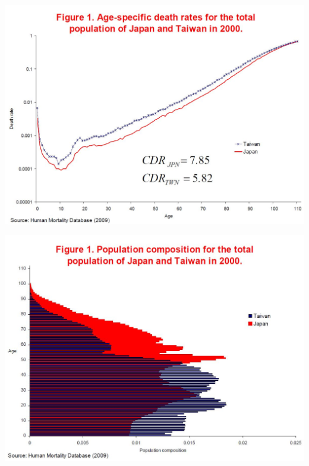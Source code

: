 \documentclass[xcolor={dvipsnames}]{beamer}
\begin{document}
\begin{frame}
\begin{center}
\includegraphics[scale=.3]{Figures/VCR3}
\end{center}
\end{frame}



\begin{frame}
\begin{center}
\includegraphics[scale=.3]{Figures/VCR4}
\end{center}
\end{frame}
\end{document}
